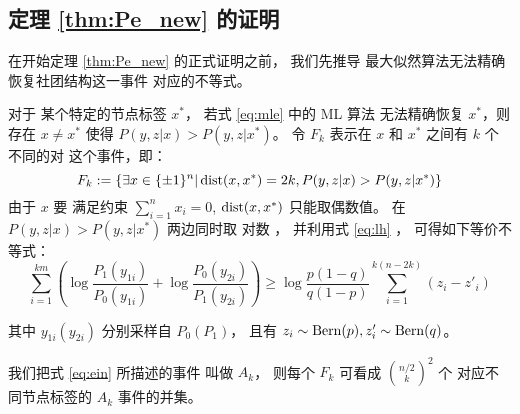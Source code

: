 \subsection{定理 \ref{thm:Pe_new} 的证明}

在开始定理 \ref{thm:Pe_new}  的正式证明之前，
我们先推导
最大似然算法无法精确恢复社团结构这一事件
对应的不等式。

对于
某个特定的节点标签
$x^*$，
若式
\eqref{eq:mle} 中的 ML 算法
无法精确恢复 
$x^*$，则
存在 $x\neq x^*$ 使得 $P(y,z|x) > P(y,z|x^*)$。
令 $F_k$ 表示在 $x$ 和 $x^*$ 之间有 $k$ 个不同的对
这个事件，即：
    \begin{equation}\label{eq:Fk}
    F_k:=\{\exists x \in \{\pm 1\}^n |
    \operatorname{dist}(x, x^*)=2k,
    P(y,z|x) > 
    P(y,z|x^*) \}
    \end{equation}
    由于
    $x$ 要 满足约束
    $\sum_{i=1}^n x_i=0$,
    $\operatorname{dist}(x, x^*)$
    只能取偶数值。
    在
    $P(y,z|x) > P(y,z|x^*)$
    两边同时取
    对数
    ， 并利用式
    \eqref{eq:lh} ，
    可得如下等价不等式：
    \begin{equation}\label{eq:ein}
    \sum_{i=1}^{km}
    \left(\log \frac{P_1(y_{1i})}
    {P_0(y_{1i})}
    + \log \frac{P_0(y_{2i})}
    {P_1(y_{2i})}
    \right)
    \geq \log \frac{p(1-q)}{q(1-p)} \sum_{i=1}^{k(n-2k)}(z_{i} - z'_{i})
    \end{equation}
    
    其中 $y_{1i}(y_{2i})$ 分别采样自
    $P_0(P_1)$，
    且有 $z_{i} \sim \operatorname{Bern}(p), z'_{i} \sim \operatorname{Bern}(q)$。
    
    我们把式 \eqref{eq:ein} 所描述的事件
    叫做 $A_k$，
    则每个 $F_k$ 
    可看成
     $\binom{n/2}{k}^2$ 个
    对应不同节点标签的
    $A_k$ 事件的并集。
    
